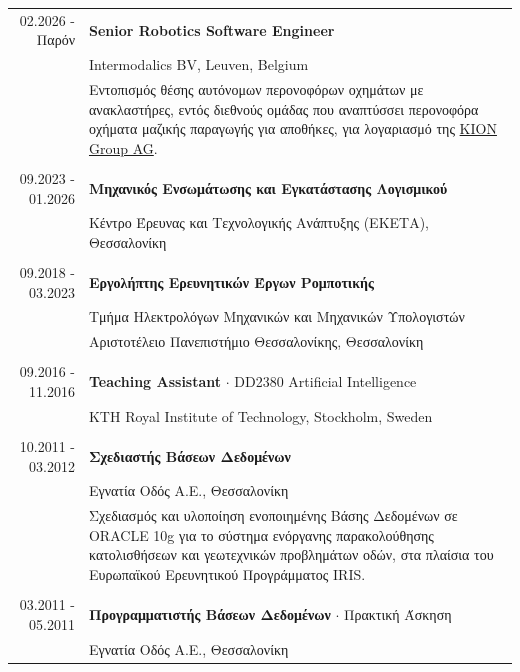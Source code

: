 \documentclass[a4paper,10pt,twoside]{article}
\begin{document}
\begin{tabular}{rp{12cm}}
02.2026 - \hfill Παρόν \hfill & \textbf{Senior Robotics Software Engineer} \\
                              &  Intermodalics BV, Leuven, Belgium \\
                              &  Εντοπισμός θέσης αυτόνομων περονοφόρων οχημάτων με ανακλαστήρες,
                                 εντός διεθνούς ομάδας που αναπτύσσει περονοφόρα οχήματα μαζικής
                                 παραγωγής για αποθήκες, για λογαριασμό της
                                 \href{https://www.youtube.com/watch?v=LWqDSMOAeec&t=10s}{KION Group AG}. \\
&\\
09.2023 - \hfill 01.2026 \hfill & \textbf{Μηχανικός Ενσωμάτωσης και Εγκατάστασης Λογισμικού} \\
                              &  Κέντρο Έρευνας και Τεχνολογικής Ανάπτυξης (ΕΚΕΤΑ), Θεσσαλονίκη\\
&\\
09.2018 - 03.2023 & \textbf{Εργολήπτης Ερευνητικών Έργων Ρομποτικής} \\
                  & Τμήμα Ηλεκτρολόγων Μηχανικών και Μηχανικών Υπολογιστών \\
                  & Αριστοτέλειο Πανεπιστήμιο Θεσσαλονίκης, Θεσσαλονίκη\\
&\\
09.2016 - 11.2016 & \textbf{Teaching Assistant} $\cdot$ DD2380 Artificial Intelligence \\
                  & KTH Royal Institute of Technology, Stockholm, Sweden\\
&\\
10.2011 - 03.2012 & \textbf{Σχεδιαστής Βάσεων Δεδομένων} \\
                  & Εγνατία Οδός Α.Ε., Θεσσαλονίκη \\
                  & Σχεδιασμός και υλοποίηση ενοποιημένης Βάσης Δεδομένων σε ORACLE 10g για
                    το σύστημα ενόργανης παρακολούθησης κατολισθήσεων και γεωτεχνικών προβλημάτων οδών,
                    στα πλαίσια του Ευρωπαϊκού Ερευνητικού Προγράμματος IRIS. \\
&\\
03.2011 - 05.2011 & \textbf{Προγραμματιστής Βάσεων Δεδομένων} $\cdot$ Πρακτική Άσκηση \\
                  & Εγνατία Οδός Α.Ε., Θεσσαλονίκη \\

\end{tabular}
\end{document}
